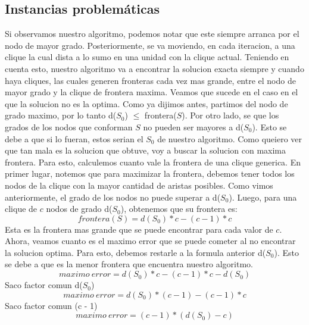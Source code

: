 \begin{itemize}
\subsection{Instancias problemáticas}
Si observamos nuestro algoritmo, podemos notar que este siempre arranca por el nodo de mayor grado. Posteriormente, se va moviendo, en cada iteracion, a una clique la cual dista a lo sumo en una unidad con la clique actual. Teniendo en cuenta esto, nuestro algoritmo va a encontrar la solucion exacta siempre y cuando haya cliques, las cuales generen fronteras cada vez mas grande, entre el nodo de mayor grado y la clique de frontera maxima.
\newline
Veamos que sucede en el caso en el que la solucion no es la optima. Como ya dijimos antes, partimos del nodo de grado maximo, por lo tanto d($S_{0}$) $\leq$ frontera($S$). Por otro lado, se que los grados de los nodos que conforman $S$ no pueden ser mayores a d($S_{0}$). Esto se debe a que si lo fueran, estos serian el $S_{0}$ de nuestro algoritmo. Como queiero ver que tan mala es la solucion que obtuve, voy a buscar la solucion con maxima frontera. Para esto, calculemos cuanto vale la frontera de una clique generica. \newline
En primer lugar, notemos que para maximizar la frontera, debemos tener todos los nodos de la clique con la mayor cantidad de aristas posibles. Como vimos anteriormente, el grado de los nodos no puede superar a d($S_{0}$). Luego, para una clique de $c$ nodos de grado d($S_{0}$), obtenemos que su frontera es:
\begin{equation}
  frontera(S) = d(S_{0}) * c - (c - 1) * c
\end{equation} 
Esta es la frontera mas grande que se puede encontrar para cada valor de $c$.
\newline 
Ahora, veamos cuanto es el maximo error que se puede cometer al no encontrar la solucion optima. Para esto, debemos restarle a la formula anterior d($S_{0}$). Esto se debe a que es la menor frontera que encuentra nuestro algoritmo.
\begin{equation}
  maximo\ error = d(S_{0}) * c - (c - 1) * c - d(S_{0}) 
\end{equation} 
Saco factor comun d($S_{0}$)
\begin{equation}
  maximo\ error = d(S_{0}) * (c - 1) - (c - 1) * c 
\end{equation} 
Saco factor comun (c - 1)
\begin{equation}
  maximo\ error = (c - 1) * (d(S_{0}) - c) 
\end{equation} 

\end{itemize}
